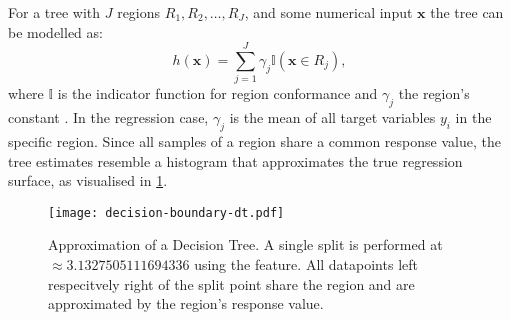 For a tree with $J$ regions $R_1, R_2,\ldots, R_J$, and some numerical input $\mathbf{x}$ the tree can be modelled as:
\begin{equation}
    h(\mathbf{x})=\sum_{j=1}^{J} \gamma_{j} \mathbb{I}\left(\mathbf{x} \in R_{j}\right),
    \label{eq:decision-tree}
\end{equation}
where $\mathbb{I}$ is the indicator function for region conformance and $\gamma_j$ the region's constant \autocite[][326]{hastietrevorElementsStatisticalLearning2009}. In the regression case, $\gamma_j$ is the mean of all target variables $y_i$ in the specific region. Since all samples of a region share a common response value, the tree estimates resemble a histogram that approximates the true regression surface, as visualised in \cref{fig:decision-boundary-dt}.

\begin{figure}[ht]
    \centering
    \texttt{[image: decision-boundary-dt.pdf]}
    \caption[Approximation of Decision Tree]{Approximation of a Decision Tree. A single split is performed at $\approx\num{3.1327505111694336}$ using the feature. All datapoints left respecitvely right of the split point share the region and are approximated by the region's response value.}
    \label{fig:decision-boundary-dt}
\end{figure}

